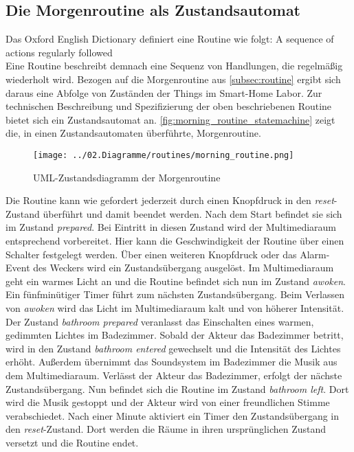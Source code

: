 \subsection{Die Morgenroutine als Zustandsautomat}

Das Oxford English Dictionary definiert eine Routine wie folgt:
\glqq A sequence of actions regularly followed \grqq\ \cite{oed_routine}\\

Eine Routine beschreibt demnach eine Sequenz von Handlungen, die regelmäßig wiederholt wird.
Bezogen auf die Morgenroutine aus \autoref{subsec:routine} ergibt sich daraus eine Abfolge von Zuständen der Things im Smart-Home Labor.
Zur technischen Beschreibung und Spezifizierung der oben beschriebenen Routine bietet sich ein Zustandsautomat an. 
\autoref{fig:morning_routine_statemachine} zeigt die, in einen Zustandsautomaten überführte, Morgenroutine.

\begin{figure}[h]
 \centering
 \texttt{[image: ../02.Diagramme/routines/morning\_routine.png]}
 \caption{UML-Zustandsdiagramm der Morgenroutine}
 \label{fig:morning_routine_statemachine}
\end{figure}

Die Routine kann wie gefordert jederzeit durch einen Knopfdruck in den \textit{reset}-Zustand überführt und damit beendet werden.
Nach dem Start befindet sie sich im Zustand \textit{prepared}. Bei Eintritt in diesen Zustand wird der Multimediaraum entsprechend vorbereitet.
Hier kann die Geschwindigkeit der Routine über einen Schalter festgelegt werden.
Über einen weiteren Knopfdruck oder das Alarm-Event des Weckers wird ein Zustandsübergang ausgelöst.
Im Multimediaraum geht ein warmes Licht an und die Routine befindet sich nun im Zustand \textit{awoken}.
Ein fünfminütiger Timer führt zum nächsten Zustandsübergang.
Beim Verlassen von \textit{awoken} wird das Licht im Multimediaraum kalt und von höherer Intensität.
Der Zustand \textit{bathroom prepared} veranlasst das Einschalten eines warmen, gedimmten Lichtes im Badezimmer.
Sobald der Akteur das Badezimmer betritt, wird in den Zustand \textit{bathroom entered} gewechselt und die Intensität des Lichtes erhöht.
Außerdem übernimmt das Soundsystem im Badezimmer die Musik aus dem Multimediaraum.
Verlässt der Akteur das Badezimmer, erfolgt der nächste Zustandsübergang. Nun befindet sich die Routine im Zustand \textit{bathroom left}.
Dort wird die Musik gestoppt und der Akteur wird von einer freundlichen Stimme verabschiedet.
Nach einer Minute aktiviert ein Timer den Zustandsübergang in den \textit{reset}-Zustand.
Dort werden die Räume in ihren ursprünglichen Zustand versetzt und die Routine endet.\\

